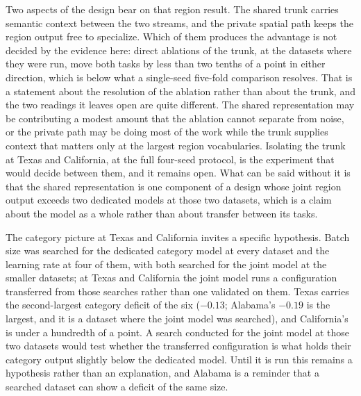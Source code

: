 Two aspects of the design bear on that region result. The shared trunk carries semantic context
between the two streams, and the private spatial path keeps the region output free to specialize.
Which of them produces the advantage is not decided by the evidence here: direct ablations of the
trunk, at the datasets where they were run, move both tasks by less than two tenths of a point in
either direction, which is below what a single-seed five-fold comparison resolves. That is a
statement about the resolution of the ablation rather than about the trunk, and the two readings it
leaves open are quite different. The shared representation may be contributing a modest amount that
the ablation cannot separate from noise, or the private path may be doing most of the work while the
trunk supplies context that matters only at the largest region vocabularies. Isolating the trunk at
Texas and California, at the full four-seed protocol, is the experiment that would decide between
them, and it remains open. What can be said without it is that the shared representation is one
component of a design whose joint region output exceeds two dedicated models at those two datasets,
which is a claim about the model as a whole rather than about transfer between its tasks.

The category picture at Texas and California invites a specific hypothesis. Batch size was searched
for the dedicated category model at every dataset and the learning rate at four of them, with both
searched for the joint model at the smaller datasets; at Texas and California the joint model runs a configuration transferred from
those searches rather than one validated on them. Texas carries the second-largest category deficit
of the six ($-0.13$; Alabama's $-0.19$ is the largest, and it is a dataset where the joint model was
searched), and California's is under a hundredth of a point. A search conducted for the joint model
at those two datasets would test whether the transferred configuration is what holds their category
output slightly below the dedicated model. Until it is run this remains a hypothesis rather than an
explanation, and Alabama is a reminder that a searched dataset can show a deficit of the same size.

